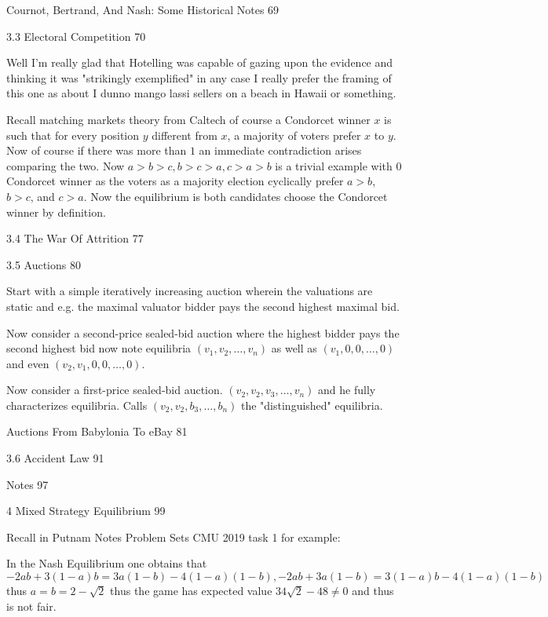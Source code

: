 Cournot, Bertrand, And Nash: Some Historical Notes 69



3.3 Electoral Competition 70

Well I'm really glad that Hotelling was capable of gazing upon the evidence and thinking it was "strikingly exemplified" in any case I really prefer the framing of this one as about I dunno mango lassi sellers on a beach in Hawaii or something.

Recall matching markets theory from Caltech of course a Condorcet winner $x$ is such that for every position $y$ different from $x$, a majority of voters prefer $x$ to $y$. Now of course if there was more than $1$ an immediate contradiction arises comparing the two. Now $a>b>c, b>c>a, c>a>b$ is a trivial example with $0$ Condorcet winner as the voters as a majority election cyclically prefer $a>b$, $b>c$, and $c>a$. Now the equilibrium is both candidates choose the Condorcet winner by definition.

3.4 The War Of Attrition 77



3.5 Auctions 80

Start with a simple iteratively increasing auction wherein the valuations are static and e.g. the maximal valuator bidder pays the second highest maximal bid.

Now consider a second-price sealed-bid auction where the highest bidder pays the second highest bid now note equilibria $(v_1,v_2,\dots,v_n)$ as well as $(v_1,0,0,\dots,0)$ and even $(v_2,v_1,0,0,\dots,0)$.

Now consider a first-price sealed-bid auction. $(v_2,v_2,v_3,\dots,v_n)$ and he fully characterizes equilibria. Calls $(v_2,v_2,b_3,\dots,b_n)$ the "distinguished" equilibria.

Auctions From Babylonia To eBay 81



3.6 Accident Law 91



Notes 97



4 Mixed Strategy Equilibrium 99

Recall in Putnam Notes Problem Sets CMU 2019 task 1 for example:

In the Nash Equilibrium one obtains that $-2ab+3(1-a)b=3a(1-b)-4(1-a)(1-b),-2ab+3a(1-b)=3(1-a)b-4(1-a)(1-b)$ thus $a=b=2-\sqrt{2}$ thus the game has expected value $34\sqrt{2}-48 \neq 0$ and thus is not fair.


